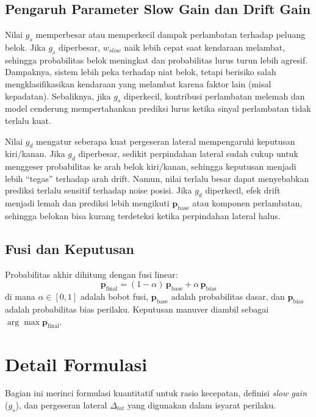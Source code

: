 \documentclass[conference]{IEEEtran}
\begin{document}
\subsection{Pengaruh Parameter Slow Gain dan Drift Gain}
Nilai $g_s$ memperbesar atau memperkecil dampak perlambatan terhadap peluang belok. Jika $g_s$ diperbesar, $w_{slow}$ naik lebih cepat saat kendaraan melambat, sehingga probabilitas belok meningkat dan probabilitas lurus turun lebih agresif. Dampaknya, sistem lebih peka terhadap niat belok, tetapi berisiko salah mengklasifikasikan kendaraan yang melambat karena faktor lain (misal kepadatan). Sebaliknya, jika $g_s$ diperkecil, kontribusi perlambatan melemah dan model cenderung mempertahankan prediksi lurus ketika sinyal perlambatan tidak terlalu kuat.

Nilai $g_d$ mengatur seberapa kuat pergeseran lateral mempengaruhi keputusan kiri/kanan. Jika $g_d$ diperbesar, sedikit perpindahan lateral sudah cukup untuk menggeser probabilitas ke arah belok kiri/kanan, sehingga keputusan menjadi lebih ``tegas'' terhadap arah drift. Namun, nilai terlalu besar dapat menyebabkan prediksi terlalu sensitif terhadap noise posisi. Jika $g_d$ diperkecil, efek drift menjadi lemah dan prediksi lebih mengikuti $\mathbf{p}_{\text{base}}$ atau komponen perlambatan, sehingga belokan bisa kurang terdeteksi ketika perpindahan lateral halus.

\subsection{Fusi dan Keputusan}
Probabilitas akhir dihitung dengan fusi linear:
\begin{equation}
\mathbf{p}_{\text{final}} = (1-\alpha)\,\mathbf{p}_{\text{base}} + \alpha\,\mathbf{p}_{\text{bias}}
\end{equation}
di mana $\alpha \in [0,1]$ adalah bobot fusi, $\mathbf{p}_{\text{base}}$ adalah probabilitas dasar, dan $\mathbf{p}_{\text{bias}}$ adalah probabilitas bias perilaku.
Keputusan manuver diambil sebagai $\arg\max\mathbf{p}_{\text{final}}$.

\section{Detail Formulasi}
Bagian ini merinci formulasi kuantitatif untuk rasio kecepatan, definisi \textit{slow gain} ($g_s$), dan pergeseran lateral $\Delta_{lat}$ yang digunakan dalam isyarat perilaku.
\end{document}
